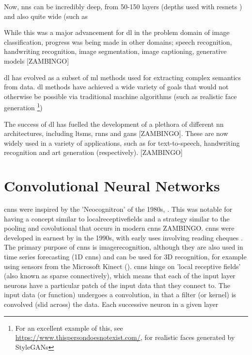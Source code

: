 Now, \gls{nn}s can be incredibly deep, from 50-150 layers (depths used with \gls{resnet}s \cite{resnet}) and also quite wide (such as 


While this was a major advancement for \gls{dl} in the problem domain of image classification, progress was being made in other domains; speech recognition, handwriting recognition, image segmentation, image captioning, generative models [ZAMBINGO] \bigskip %
 
\gls{dl} has evolved as a subset of \gls{ml} methods used for extracting complex semantics from data. \gls{dl} methods have achieved a wide variety of goals that would not otherwise be possible via traditional machine algorithms (such as realistic face generation \footnote{For an excellent example of this, see \url{https://www.thispersondoesnotexist.com/}, for realistic faces generated by StyleGANs})  \bigskip%

The success of  \gls{dl} has fuelled the development of a plethora of different  \gls{nn} architectures, including \gls{ltsm}s, \gls{rnn}s and \gls{gan}s [ZAMBINGO]. These are now widely used in a variety of applications, such as for text-to-speech, handwriting recognition and art generation (respectively). [ZAMBINGO]  \bigskip 

\section{Convolutional Neural Networks}

\gls{cnn}s were inspired by the 'Neocognitron' of the 1980s,\cite{neocognitron_proposal} \cite{neocognitron}. This was notable for having a concept similar to \gls{localreceptivefields} and a strategy similar to the pooling and covolutional that occurs in modern \gls{cnn}s ZAMBINGO. \gls{cnn}s were developed in earnest by in the 1990s, with early uses involving reading cheques \cite{lecun_cheques}. The primary purpose of \gls{cnn}s is \gls{imagerecognition}, although they are also used in time series forecasting (1D \gls{cnn}s) and can be used for 3D recognition, for example using sensors from the Microsoft Kinect (\cite{3d_conv}). \gls{cnn}s hinge on 'local receptive fields' (also known as sparse connectively), which means that each of the input layer neurons have a particular patch of the input data that they connect to. The input data (or function) undergoes a convolution, in that a filter (or kernel) is convolved (slid across) the data. Each successive neuron in a given layer \cite[Chapter~5]{good_fellow_2016}

